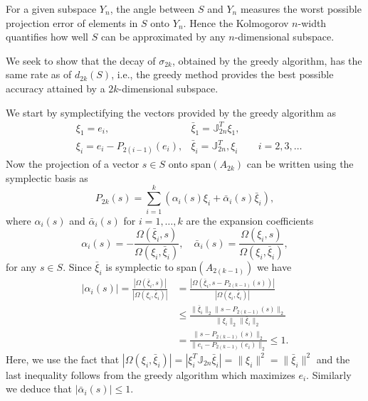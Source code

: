 For a given subspace $Y_n$, the angle between $S$ and $Y_n$ measures the worst possible projection error of elements in $S$ onto $Y_n$. Hence the Kolmogorov $n$-width quantifies how well $S$ can be approximated by any $n$-dimensional subspace. 

We seek to show that the decay of $\sigma_{2k}$, obtained by the greedy algorithm, has the same rate as of $d_{2k}(S)$, i.e., the greedy method provides the best possible accuracy attained by a $2k$-dimensional subspace.

We start by symplectifying the vectors provided by the greedy algorithm as
\begin{equation} \label{eq:new6}
\begin{aligned}
	& \xi_1 = e_i, & \bar{\xi}_1 = \mathbb{J}_{2n}^T \xi_1, &\\
	& \xi_i = e_i - P_{2(i-1)} (e_i), & \bar{\xi}_i = \mathbb{J}_{2n}^T, \xi_i &\quad i = 2,3,\dots
\end{aligned}
\end{equation}
Now the projection of a vector $s\in S$ onto span$(A_{2k})$ can be written using the symplectic basis as
\begin{equation} \label{eq:new7}
	P_{2k}(s) = \sum_{i=1}^k \left( \alpha_i(s) \xi_i + \bar{\alpha}_i(s) \bar{\xi}_i \right),
\end{equation}
where $\alpha_i(s)$ and $\bar{\alpha}_i(s)$ for $i=1,\dots,k$ are the expansion coefficients
\begin{equation} \label{eq:new8}
	\alpha_i(s) = - \frac{\Omega(\bar{\xi}_i,s)}{\Omega(\xi_i,\bar{\xi}_i)}, \quad \bar{\alpha}_i(s) = \frac{\Omega(\xi_i,s)}{\Omega(\xi_i,\bar{\xi}_i)},
\end{equation}
for any $s\in S$. Since $\bar{\xi}_i$ is symplectic to span$(A_{2(k-1)})$ we have
\begin{equation} \label{eq:new9}
\begin{aligned}
	|\alpha_i(s)| = \frac{|\Omega(\bar{\xi}_i,s)|}{|\Omega(\xi_i,\bar{\xi}_i)|} &= \frac{|\Omega( \bar{\xi}_i, s - P_{2(k-1)}(s))|}{|\Omega(\xi_i,\bar{\xi}_i)|} \\
	&\leq \frac{\|\bar{\xi}_i\|_2 \| s - P_{2(k-1)}(s) \|_2}{ \|\xi_i\|_2 \|\bar{\xi}_i\|_2 } \\
	&= \frac{\| s - P_{2(k-1)}(s) \|_2}{\| e_i - P_{2(k-1)}(e_i) \|_2} \leq 1.
\end{aligned}
\end{equation}
Here, we use the fact that $|\Omega(\xi_i,\bar{\xi}_i)| = |\xi_i^T \mathbb{J}_{2n}\bar{\xi}_i| = \| \xi_i \|^2 = \|\bar{\xi}_i\|^2$ and the last inequality follows from the greedy algorithm which maximizes $e_i$. Similarly we deduce that $|\bar{\alpha}_i(s)|\leq 1$.

